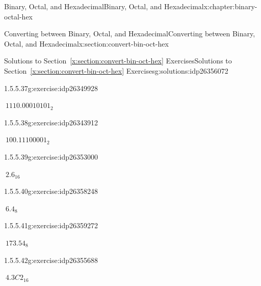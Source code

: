 \documentclass[twoside,10pt,]{book}
\newcommand{\xreffont}{\relax}
\numberwithin{equation}{section}
\begin{document}
\begin{chapterptx}{Binary, Octal, and Hexadecimal}{}{Binary, Octal, and Hexadecimal}{}{}{x:chapter:binary-octal-hex}
\begin{sectionptx}{Converting between Binary, Octal, and Hexadecimal}{}{Converting between Binary, Octal, and Hexadecimal}{}{}{x:section:convert-bin-oct-hex}
\begin{solutions-subsection}{Solutions to Section~{\xreffont\ref*{x:section:convert-bin-oct-hex}} Exercises}{}{Solutions to Section~{\xreffont\ref*{x:section:convert-bin-oct-hex}} Exercises}{}{}{g:solutions:idp26356072}
\begin{exercisegroup}
\begin{divisionsolutioneg}{1.5.5.37}{}{g:exercise:idp26349928}%
\par\smallskip%
\noindent\hypertarget{g:solution:idp26351592-main}{}\(\ 1110.00010101_2\)\end{divisionsolutioneg}%
\begin{divisionsolutioneg}{1.5.5.38}{}{g:exercise:idp26343912}%
\par\smallskip%
\noindent\hypertarget{g:solution:idp26354664-main}{}\(\ 100.11100001_2\)\end{divisionsolutioneg}%
\begin{divisionsolutioneg}{1.5.5.39}{}{g:exercise:idp26353000}%
\par\smallskip%
\noindent\hypertarget{g:solution:idp26359016-main}{}\(\ 2.6_{16}\)\end{divisionsolutioneg}%
\begin{divisionsolutioneg}{1.5.5.40}{}{g:exercise:idp26358248}%
\par\smallskip%
\noindent\hypertarget{g:solution:idp26352616-main}{}\(\ 6.4_8\)\end{divisionsolutioneg}%
\begin{divisionsolutioneg}{1.5.5.41}{}{g:exercise:idp26359272}%
\par\smallskip%
\noindent\hypertarget{g:solution:idp26355176-main}{}\(\ 173.54_8\)\end{divisionsolutioneg}%
\begin{divisionsolutioneg}{1.5.5.42}{}{g:exercise:idp26355688}%
\par\smallskip%
\noindent\hypertarget{g:solution:idp26357224-main}{}\(\ 4.3C2_{16}\)\end{divisionsolutioneg}%
\end{exercisegroup}
\par\medskip\noindent
\end{solutions-subsection}
\end{sectionptx}
\end{chapterptx}
%
%
\typeout{************************************************}
\typeout{************************************************}
%
\end{document}
